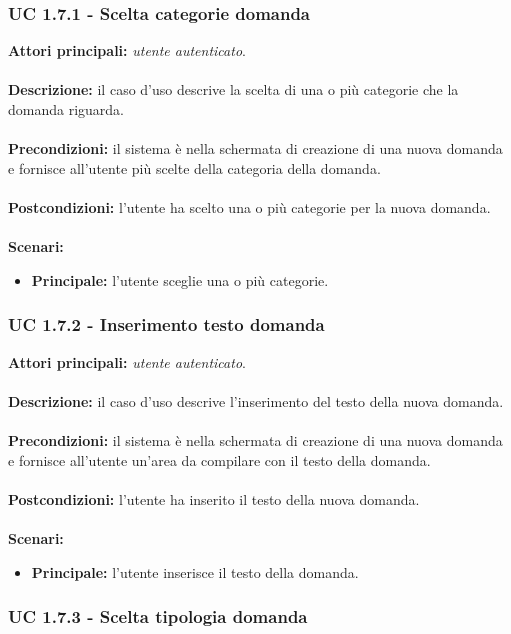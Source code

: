 \documentclass[a4paper,11pt]{article}
\begin{document}
\subsubsection{UC 1.7.1 - Scelta categorie domanda}

\textbf{Attori principali:} \textit{utente autenticato}.\\
\\
\textbf{Descrizione:} il caso d'uso descrive la scelta di una o più categorie che la domanda riguarda. \\
\\
\textbf{Precondizioni:} il sistema è nella schermata di creazione di una nuova domanda e fornisce all'utente più scelte della categoria della domanda.\\
\\
\textbf{Postcondizioni:} l'utente ha scelto una o più categorie per la nuova domanda. \\
\\
\textbf{Scenari:}
\begin{itemize}
\item \textbf{Principale:} l'utente sceglie una o più categorie.
\end{itemize}
\vspace{6 mm}
\subsubsection{UC 1.7.2 - Inserimento testo domanda}

\textbf{Attori principali:} \textit{utente autenticato}.\\
\\
\textbf{Descrizione:} il caso d'uso descrive l'inserimento del testo della nuova domanda. \\
\\
\textbf{Precondizioni:} il sistema è nella schermata di creazione di una nuova domanda e fornisce all'utente un'area da compilare con il testo della domanda.\\
\\
\textbf{Postcondizioni:} l'utente ha inserito il testo della nuova domanda. \\
\\
\textbf{Scenari:}
\begin{itemize}
\item \textbf{Principale:} l'utente inserisce il testo della domanda.
\end{itemize}
\vspace{6 mm}
\subsubsection{UC 1.7.3 - Scelta tipologia domanda}
\end{document}
